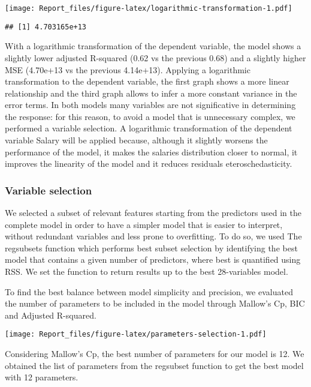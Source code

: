 \documentclass[
]{article}
\begin{document}
\texttt{[image: Report\_files/figure-latex/logarithmic-transformation-1.pdf]}

\begin{verbatim}
## [1] 4.703165e+13
\end{verbatim}

With a logarithmic transformation of the dependent variable, the model
shows a slightly lower adjusted R-squared (0.62 vs the previous 0.68)
and a slightly higher MSE (4.70e+13 vs the previous 4.14e+13). Applying
a logarithmic transformation to the dependent variable, the first graph
shows a more linear relationship and the third graph allows to infer a
more constant variance in the error terms. In both models many variables
are not significative in determining the response: for this reason, to
avoid a model that is unnecessary complex, we performed a variable
selection. A logarithmic transformation of the dependent variable Salary
will be applied because, although it slightly worsens the performance of
the model, it makes the salaries distribution closer to normal, it
improves the linearity of the model and it reduces residuals
eteroschedasticity.

\hypertarget{variable-selection}{%
\subsubsection{Variable selection}\label{variable-selection}}

We selected a subset of relevant features starting from the predictors
used in the complete model in order to have a simpler model that is
easier to interpret, without redundant variables and less prone to
overfitting. To do so, we used The regsubsets function which performs
best subset selection by identifying the best model that contains a
given number of predictors, where best is quantified using RSS. We set
the function to return results up to the best 28-variables model.

To find the best balance between model simplicity and precision, we
evaluated the number of parameters to be included in the model through
Mallow's Cp, BIC and Adjusted R-squared.

\texttt{[image: Report\_files/figure-latex/parameters-selection-1.pdf]}

Considering Mallow's Cp, the best number of parameters for our model is
12. We obtained the list of parameters from the regsubset function to
get the best model with 12 parameters.
\end{document}
